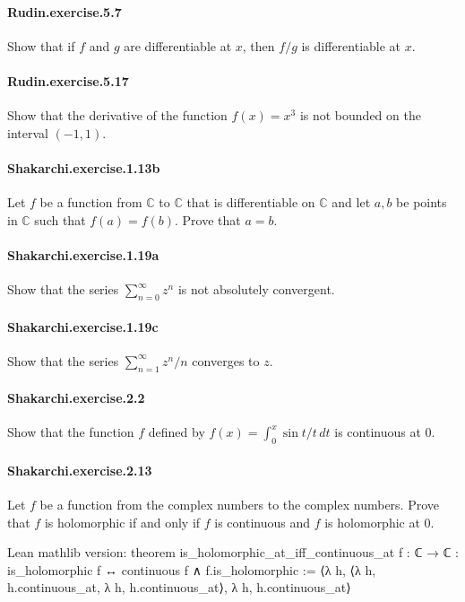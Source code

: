 \documentclass{article}
\begin{document}
\paragraph{Rudin.exercise.5.7} Show that if $f$ and $g$ are differentiable at $x$, then $f/g$ is differentiable at $x$.

\paragraph{Rudin.exercise.5.17} Show that the derivative of the function $f(x)=x^3$ is not bounded on the interval $(-1,1)$.

\paragraph{Shakarchi.exercise.1.13b} Let $f$ be a function from $\mathbb{C}$ to $\mathbb{C}$ that is differentiable on $\mathbb{C}$ and let $a, b$ be points in $\mathbb{C}$ such that $f(a) = f(b)$. Prove that $a = b$.

\paragraph{Shakarchi.exercise.1.19a} Show that the series
  $\sum_{n=0}^\infty z^n$ is not absolutely convergent.

\paragraph{Shakarchi.exercise.1.19c} Show that the series
  $\sum_{n=1}^\infty z^n/n$ converges to $z$.

\paragraph{Shakarchi.exercise.2.2} Show that the function $f$ defined by $f(x) = \int_0^x \sin t / t \, dt$ is continuous at $0$.

\paragraph{Shakarchi.exercise.2.13} Let $f$ be a function from the complex numbers to the complex numbers. Prove that $f$ is holomorphic if and only if $f$ is continuous and $f$ is holomorphic at $0$.

Lean mathlib version:
theorem is_holomorphic_at_iff_continuous_at {f : ℂ → ℂ} :
  is_holomorphic f ↔ continuous f ∧ f.is_holomorphic :=
⟨λ h, ⟨λ h, h.continuous_at, λ h, h.continuous_at⟩, λ h, h.continuous_at⟩
\end{document}

